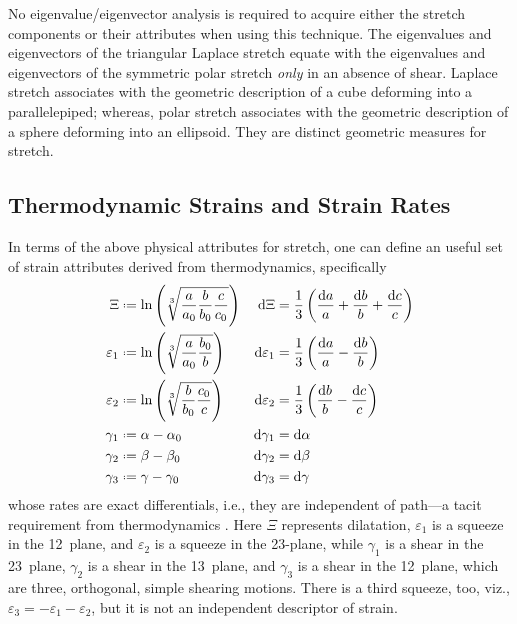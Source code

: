 No eigen\-value\slash eigen\-vector analysis is required to acquire either the stretch components or their attributes when using this technique. \cite{Srinivasa12} The eigen\-values and eigen\-vectors of the triangular Laplace stretch equate with the eigen\-values and eigen\-vectors of the symmetric polar stretch \textit{only\/} in an absence of shear. \cite{Rosakis90}  Laplace stretch associates with the geometric description of a cube deforming into a parallelepiped; whereas, polar stretch associates with the geometric description of a sphere deforming into an ellipsoid.  They are distinct geometric measures for stretch.

\subsection{Thermodynamic Strains and Strain Rates}
\label{strainsAndStrainRates3D}

In terms of the above physical attributes for stretch, one can define an useful set of strain attributes derived from thermo\-dynamics, specifically \cite{Freed17}
\begin{subequations}
    \label{thermodynamicStrains3D}
    \begin{align}
    \Xi & \defeq \ln \left( \sqrt[3]{\frac{a}{a_0} \frac{b}{b_0} \frac{c}{c_0}} \right) & 
    \mathrm{d} \Xi & = \frac{1}{3} \left( \frac{\mathrm{d}a}{a} + 
    \frac{\mathrm{d}b}{b} + \frac{\mathrm{d}c}{c} \right) \\
    \varepsilon_1 & \defeq \ln \left( \sqrt[3]{\frac{a}{a_0} \frac{b_0}{b}} \right) &
    \mathrm{d} \varepsilon_1 & = \frac{1}{3} \left( \frac{\mathrm{d}a}{a} - 
    \frac{\mathrm{d}b}{b} \right) \\
    \varepsilon_2 & \defeq \ln \left( \sqrt[3]{\frac{b}{b_0} \frac{c_0}{c}} \right) &
    \mathrm{d} \varepsilon_2 & = \frac{1}{3} \left( \frac{\mathrm{d}b}{b} - 
    \frac{\mathrm{d}c}{c} \right) \\
    \gamma_1 & \defeq \alpha - \alpha_0 & 
    \mathrm{d} \gamma_1 & = \mathrm{d} \alpha \\
    \gamma_2 & \defeq \beta - \beta_0 & 
    \mathrm{d} \gamma_2 & = \mathrm{d} \beta \\
    \gamma_3 & \defeq \gamma - \gamma_0 & 
    \mathrm{d} \gamma_3 & = \mathrm{d} \gamma
    \end{align}
\end{subequations}
whose rates are exact differentials, i.e., they are independent of path---a tacit requirement from thermo\-dynamics \cite{Caratheodory09}.  Here $\Xi$ represents dilatation, $\varepsilon_1$ is a squeeze in the 12~plane, and $\varepsilon_2$ is a squeeze in the 23-plane, while $\gamma_1$ is a shear in the 23~plane, $\gamma_2$ is a shear in the 13~plane, and $\gamma_3$ is a shear in the 12~plane, which are three, orthogonal, simple shearing motions.  There is a third squeeze, too, viz., $\varepsilon_3 = -\varepsilon_1 - \varepsilon_2$, but it is not an independent descriptor of strain.

